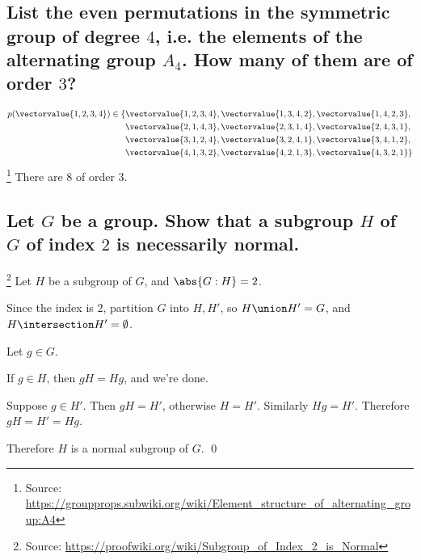 \section[Problem 4]{}
    \subsection[(i)]{List the even permutations in the symmetric group of degree $4$,
        i.e. the elements of the alternating group $A_4$. How many of them are of order $3$?}
        
        \begin{align*}
            p(\vectorvalue{1,2,3,4})
            \in \{
                &\vectorvalue{1,2,3,4},
                \vectorvalue{1,3,4,2},
                \vectorvalue{1,4,2,3},\\
                &\vectorvalue{2,1,4,3},
                \vectorvalue{2,3,1,4},
                \vectorvalue{2,4,3,1},\\
                &\vectorvalue{3,1,2,4},
                \vectorvalue{3,2,4,1},
                \vectorvalue{3,4,1,2},\\
                &\vectorvalue{4,1,3,2},
                \vectorvalue{4,2,1,3},
                \vectorvalue{4,3,2,1}\}
        \end{align*}
        \footnote{Source: \url{https://groupprops.subwiki.org/wiki/Element_structure_of_alternating_group:A4}}
        There are $8$ of order $3$.

    \subsection[(ii)]{Let $G$ be a group. Show that a subgroup $H$ of $G$ of index $2$ is necessarily normal.}
        \footnote{Source: \url{https://proofwiki.org/wiki/Subgroup_of_Index_2_is_Normal}}
        Let $H$ be a subgroup of $G$, and $\abs{G:H} = 2$.

        Since the index is $2$, partition $G$ into $H, H'$, 
        so $H \union H' = G$, and $H \intersection H' = \emptyset$.

        Let $g \in G$.

        If $g \in H$, then $gH = Hg$, and we're done.

        Suppose $g \in H'$.
        Then $gH = H'$, otherwise $H = H'$.
        Similarly $Hg = H'$.
        Therefore $gH = H' = Hg$.

        Therefore $H$ is a normal subgroup of $G$.
        \qed


